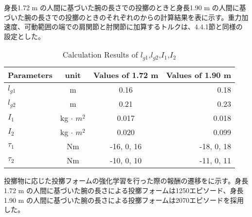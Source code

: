 身長1.72 m の人間に基づいた腕の長さでの投擲のときと身長1.90 m の人間に基づいた腕の長さでの投擲のときのそれぞれのからの計算結果を表に示す。重力加速度、可動範囲の端での肩関節と肘関節に加算するトルクは、4.4.1節と同様の設定とした。
\begin{table}[tb]
  \begin{center}
    \caption{Calculation Results of $l_{g1}$,$l_{g2}$,$I_{1}$,$I_{2}$}
    \begin{tabular}{l|c|c|r}
      \hline
      Parameters & unit & Values of 1.72 m & Values of 1.90 m \\
      \hline
      $l_{g1}$ & m & 0.16 & 0.18 \\
      $l_{g2}$ & m & 0.21 & 0.23 \\
      $I_{1}$ & kg $\cdot$ ${m}^2$ & 0.017 & 0.018 \\
      $I_{2}$ & kg $\cdot$ ${m}^2$ & 0.020 & 0.099 \\
      $\tau_{1}$ & Nm & -16, 0, 16 & -18, 0, 18 \\
      $\tau_{2}$ & Nm & -10, 0, 10 & -11, 0, 11 \\
      \hline
    \end{tabular}
  \end{center}
\end{table}

投擲物に応じた投擲フォームの強化学習を行った際の報酬の遷移をに示す。身長1.72 m の人間に基づいた腕の長さによる投擲フォームは1250エピソード、身長1.90 m の人間に基づいた腕の長さによる投擲フォームは2070エピソードを採用した。

